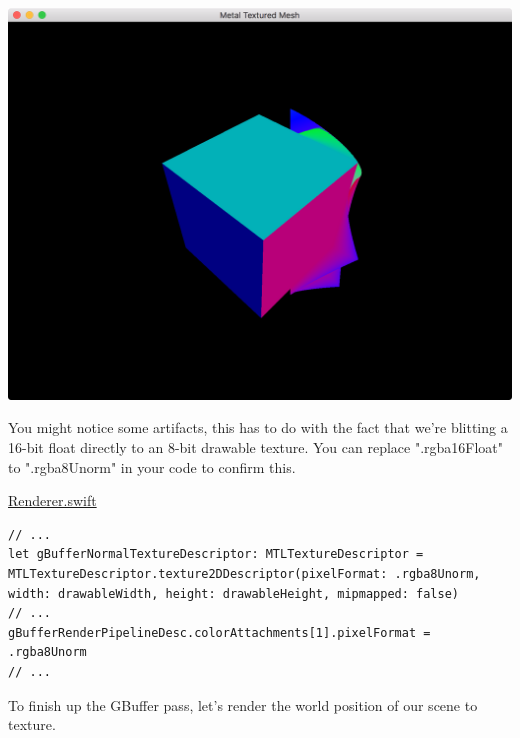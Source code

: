 \documentclass[11pt]{article}
\begin{document}
\begin{center}
\includegraphics[width=.9\linewidth]{../img/posts/implementing-deferred-shading-in-metal/normal.png}
\end{center}

You might notice some artifacts, this has to do with the fact that we're
blitting a 16-bit float directly to an 8-bit drawable texture. You can replace
".rgba16Float" to ".rgba8Unorm" in your code to confirm this.

\uline{Renderer.swift}
\begin{verbatim}
// ...
let gBufferNormalTextureDescriptor: MTLTextureDescriptor = MTLTextureDescriptor.texture2DDescriptor(pixelFormat: .rgba8Unorm, width: drawableWidth, height: drawableHeight, mipmapped: false)
// ...
gBufferRenderPipelineDesc.colorAttachments[1].pixelFormat = .rgba8Unorm
// ...
\end{verbatim}

To finish up the GBuffer pass, let's render the world position of our scene to texture.
\end{document}
